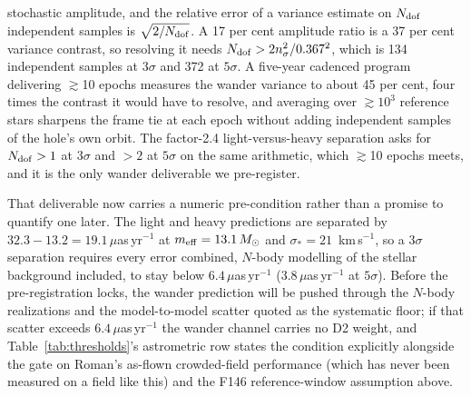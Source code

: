 \documentclass[11pt]{article}
\newcommand{\msun}{\ensuremath{M_\odot}}
\begin{document}
stochastic amplitude, and the relative error of a variance estimate on $N_{\rm dof}$ independent samples is $\sqrt{2/N_{\rm dof}}$. A 17 per cent amplitude ratio is a 37 per cent variance contrast, so resolving it needs $N_{\rm dof} > 2n_{\sigma}^{2}/0.367^{2}$, which is 134 independent samples at $3\sigma$ and 372 at $5\sigma$. A five-year cadenced program delivering $\gtrsim$10 epochs measures the wander variance to about 45 per cent, four times the contrast it would have to resolve, and averaging over $\gtrsim 10^{3}$ reference stars sharpens the frame tie at each epoch without adding independent samples of the hole's own orbit. The factor-2.4 light-versus-heavy separation asks for $N_{\rm dof} > 1$ at $3\sigma$ and $> 2$ at $5\sigma$ on the same arithmetic, which $\gtrsim$10 epochs meets, and it is the only wander deliverable we pre-register.

That deliverable now carries a numeric pre-condition rather than a promise to quantify one later. The light and heavy predictions are separated by $32.3 - 13.2 = 19.1\,\mu$as\,yr$^{-1}$ at $m_{\rm eff} = 13.1\,\msun$ and $\sigma_{*} = 21$~km\,s$^{-1}$, so a $3\sigma$ separation requires every error combined, $N$-body modelling of the stellar background included, to stay below $6.4\,\mu$as\,yr$^{-1}$ ($3.8\,\mu$as\,yr$^{-1}$ at $5\sigma$). Before the pre-registration locks, the wander prediction will be pushed through the \citet{GonzalezPrieto2025} $N$-body realizations and the model-to-model scatter quoted as the systematic floor; if that scatter exceeds $6.4\,\mu$as\,yr$^{-1}$ the wander channel carries no D2 weight, and Table~\ref{tab:thresholds}'s astrometric row states the condition explicitly alongside the gate on Roman's as-flown crowded-field performance (which has never been measured on a field like this) and the F146 reference-window assumption above.
\end{document}
